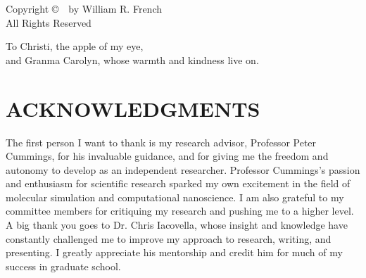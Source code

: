 \documentclass[10pt]{report}  %
\newcommand\findent{\hspace*{\parindent}}
\begin{document}
\begin{titlepage}
  \singlespace
  \vspace*{\fill}
  \begin{center}
  \begin{minipage}{.6\textwidth}
  \begin{center}
   Copyright  \copyright\ \number\year\ by William R. French \\
   All Rights Reserved
  \end{center}
  \end{minipage}
  \end{center}
  \vspace*{\fill}
\end{titlepage}

\doublespacing
{} \setcounter{page}{3}

\singlespace
\vspace*{\fill}
\begin{center}
\begin{minipage}{.6\textwidth}
\begin{center}
   To Christi, the apple of my eye, \\
   and Granma Carolyn, whose warmth and kindness live on.
\end{center}
\end{minipage}
\end{center}
\vspace*{\fill}

\chapter*{ACKNOWLEDGMENTS}
\doublespace
\vspace{7mm}

\findent The first person I want to thank is my research advisor, Professor Peter Cummings, for his invaluable guidance, and for giving me the freedom and autonomy to develop as an independent researcher. Professor Cummings's passion and enthusiasm for scientific research sparked my own excitement in the field of molecular simulation and computational nanoscience. I am also grateful to my committee members for critiquing my research and pushing me to a higher level. A big thank you goes to Dr. Chris Iacovella, whose insight and knowledge have constantly challenged me to improve my approach to research, writing, and presenting. I greatly appreciate his mentorship and credit him for much of my success in graduate school. 
\end{document}
